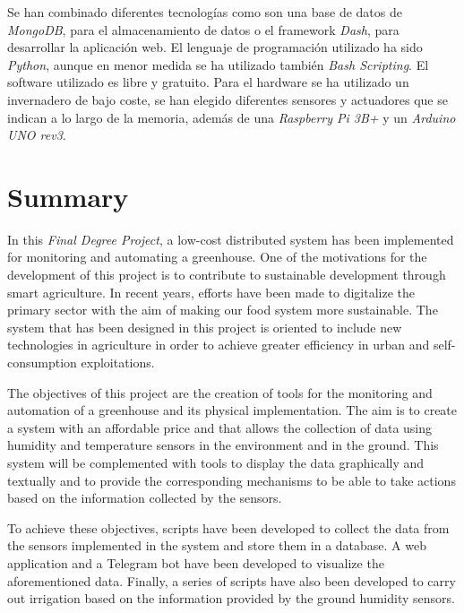 \documentclass[a4paper, 12pt, oneside]{book}
\begin{document}
Se han combinado diferentes tecnologías como son una base de datos de \textit{MongoDB}, para el almacenamiento de datos o el framework \textit{Dash}, para desarrollar la aplicación web.
El lenguaje de programación utilizado ha sido \textit{Python}, aunque en menor medida se ha utilizado también \textit{Bash Scripting}. El software utilizado es libre y gratuito. Para el hardware se ha utilizado un invernadero de bajo coste, se han elegido diferentes sensores y actuadores que se indican a lo largo de la memoria, además de una \textit{Raspberry Pi 3B+} y un \textit{Arduino UNO rev3}.


\chapter*{Summary}

In this \textit{Final Degree Project}, a low-cost distributed system has been implemented for monitoring and automating a greenhouse. One of the motivations for the development of this project is to contribute to sustainable development through smart agriculture. In recent years, efforts have been made to digitalize the primary sector with the aim of making our food system more sustainable. The system that has been designed in this project is oriented to include new technologies in agriculture in order to achieve greater efficiency in urban and self-consumption exploitations.

The objectives of this project are the creation of tools for the monitoring and automation of a greenhouse and its physical implementation. The aim is to create a system with an affordable price and that allows the collection of data using humidity and temperature sensors in the environment and in the ground. This system will be complemented with tools to display the data graphically and textually and to provide the corresponding mechanisms to be able to take actions based on the information collected by the sensors.

To achieve these objectives, scripts have been developed to collect the data from the sensors implemented in the system and store them in a database. A web application and a Telegram bot have been developed to visualize the aforementioned data. Finally, a series of scripts have also been developed to carry out irrigation based on the information provided by the ground humidity sensors.
\end{document}
